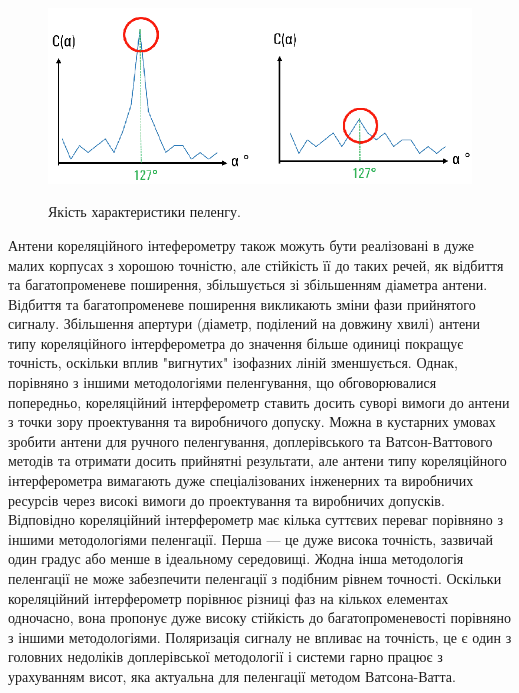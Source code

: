 \documentclass{article}
\begin{document}
\begin{figure}[H]
	\centering
	{\includegraphics[width=0.7\linewidth]{images/correletaion_interfer_graphs.png}}
	\caption{Якість характеристики пеленгу.}
\end{figure}

Антени кореляційного інтеферометру також можуть бути реалізовані в дуже малих корпусах з хорошою точністю, але стійкість її до таких речей, як відбиття та багатопроменеве поширення, збільшується зі збільшенням діаметра антени. Відбиття та багатопроменеве поширення викликають зміни фази прийнятого сигналу. Збільшення апертури (діаметр, поділений на довжину хвилі) антени типу кореляційного інтерферометра до значення більше одиниці покращує точність, оскільки вплив "вигнутих" ізофазних ліній зменшується. Однак, порівняно з іншими методологіями пеленгування, що обговорювалися попередньо, кореляційний інтерферометр ставить досить суворі вимоги до антени з точки зору проектування та виробничого допуску. Можна в кустарних умовах зробити антени для ручного пеленгування, доплерівського та Ватсон-Ваттового методів та отримати досить прийнятні результати, але антени типу кореляційного інтерферометра вимагають дуже спеціалізованих інженерних та виробничих ресурсів через високі вимоги до проектування та виробничих допусків. Відповідно кореляційний інтерферометр має кілька суттєвих переваг порівняно з іншими методологіями пеленгації. Перша — це дуже висока точність, зазвичай один градус або менше в ідеальному середовищі. Жодна інша методологія пеленгації не може забезпечити пеленгації з подібним рівнем точності. Оскільки кореляційний інтерферометр порівнює різниці фаз на кількох елементах одночасно, вона пропонує дуже високу стійкість до багатопроменевості порівняно з іншими методологіями. Поляризація сигналу не впливає на точність, це є один з головних недоліків доплерівської методології і системи гарно працює з урахуванням висот, яка актуальна для пеленгації методом Ватсона-Ватта. 

\end{document}
